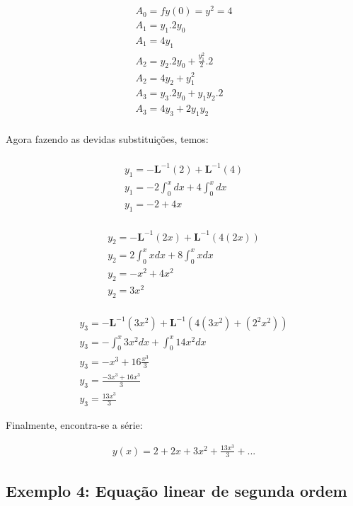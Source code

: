 \begin{gather*}
A_{0} = fy(0) = y^2 = 4\nonumber\\
A_{1} = y_{1}.2y_{0}\nonumber\\
A_{1} = 4y_{1}\nonumber\\
A_{2} = y_{2}.2y_{0} + \frac {y_{1}^{2}}{2}.2 \nonumber\\
A_{2} = 4y_{2} + y_{1}^2\nonumber\\
A_{3} = y_{3}.2y_{0}+y_{1}y_{2}.2\nonumber\\
A_{3} = 4y_{3} + 2y_{1}y_{2}\nonumber\\
\end{gather*}

Agora fazendo as devidas substituições, temos:

\begin{gather*}\nonumber\\
y_{1} = -\textbf{L}^{-1} (2) + \textbf{L}^{-1}(4)\nonumber\\
  y_{1} = -2\int_0^{x}dx + 4\int_0^{x}dx  \nonumber\\
  y_{1} = -2 + 4x
\end{gather*}

\begin{gather*}\nonumber\\
y_{2} = -\textbf{L}^{-1} (2x) + \textbf{L}^{-1}(4(2x))\nonumber\\
  y_{2} = 2\int_0^{x}xdx + 8\int_0^{x}xdx  \nonumber\\
  y_{2} = -x^2 + 4x^2\nonumber\\
  y_{2} = 3x^2\nonumber\\
\end{gather*}


\begin{gather*}
y_{3} = -\textbf{L}^{-1} (3x^2) + \textbf{L}^{-1}(4(3x^2) + (2^2x^2))\\
  y_{3} = -\int_0^{x}3x^2dx + \int_0^{x}14x^2dx  \\
  y_{3} = -x^3 + 16\frac{x^{3}}{3}\\
  y_{3} = \frac{-3x^{3} + 16x^3}{3}\\
   y_{3} = \frac{13x^{3}}{3}
\end{gather*}

Finalmente, encontra-se a série:

\begin{gather*}
  y(x) = 2 + 2x + 3x^2 + \frac{13x^{3}}{3} + ... 
\end{gather*}


\subsection{Exemplo 4: Equação linear de segunda ordem}

